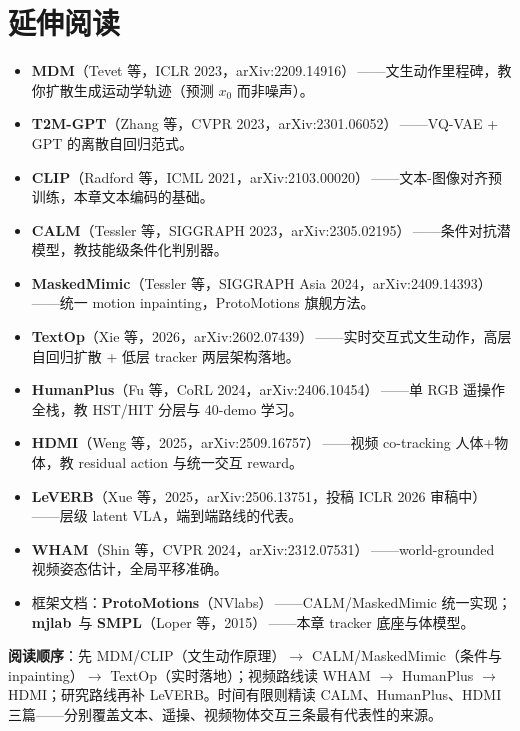 \section*{延伸阅读}
\label{sec:rlmc-mm-reading}

\begin{itemize}
  \item \textbf{MDM}（Tevet 等，ICLR 2023，arXiv:2209.14916）\,\cite{tevet2023mdm}——文生动作里程碑，教你扩散生成运动学轨迹（预测 $x_0$ 而非噪声）。
  \item \textbf{T2M-GPT}（Zhang 等，CVPR 2023，arXiv:2301.06052）\,\cite{zhang2023t2mgpt}——VQ-VAE + GPT 的离散自回归范式。
  \item \textbf{CLIP}（Radford 等，ICML 2021，arXiv:2103.00020）\,\cite{radford2021clip}——文本-图像对齐预训练，本章文本编码的基础。
  \item \textbf{CALM}（Tessler 等，SIGGRAPH 2023，arXiv:2305.02195）\,\cite{tessler2023calm}——条件对抗潜模型，教技能级条件化判别器。
  \item \textbf{MaskedMimic}（Tessler 等，SIGGRAPH Asia 2024，arXiv:2409.14393）\,\cite{tessler2024maskedmimic}——统一 motion inpainting，ProtoMotions 旗舰方法。
  \item \textbf{TextOp}（Xie 等，2026，arXiv:2602.07439）\,\cite{xie2026textop}——实时交互式文生动作，高层自回归扩散 + 低层 tracker 两层架构落地。
  \item \textbf{HumanPlus}（Fu 等，CoRL 2024，arXiv:2406.10454）\,\cite{fu2024humanplus}——单 RGB 遥操作全栈，教 HST/HIT 分层与 40-demo 学习。
  \item \textbf{HDMI}（Weng 等，2025，arXiv:2509.16757）\,\cite{weng2025hdmi}——视频 co-tracking 人体+物体，教 residual action 与统一交互 reward。
  \item \textbf{LeVERB}（Xue 等，2025，arXiv:2506.13751，投稿 ICLR 2026 审稿中）\,\cite{xue2025leverb}——层级 latent VLA，端到端路线的代表。
  \item \textbf{WHAM}（Shin 等，CVPR 2024，arXiv:2312.07531）\,\cite{shin2024wham}——world-grounded 视频姿态估计，全局平移准确。
  \item 框架文档：\textbf{ProtoMotions}（NVlabs）\,\cite{protomotions2024}——CALM/MaskedMimic 统一实现；\textbf{mjlab}\,\cite{mjlab2026} 与 \textbf{SMPL}（Loper 等，2015）\,\cite{loper2015smpl}——本章 tracker 底座与体模型。
\end{itemize}

\textbf{阅读顺序}：先 MDM/CLIP（文生动作原理）$\to$ CALM/MaskedMimic（条件与 inpainting）$\to$ TextOp（实时落地）；视频路线读 WHAM $\to$ HumanPlus $\to$ HDMI；研究路线再补 LeVERB。时间有限则精读 CALM、HumanPlus、HDMI 三篇——分别覆盖文本、遥操、视频物体交互三条最有代表性的来源。

